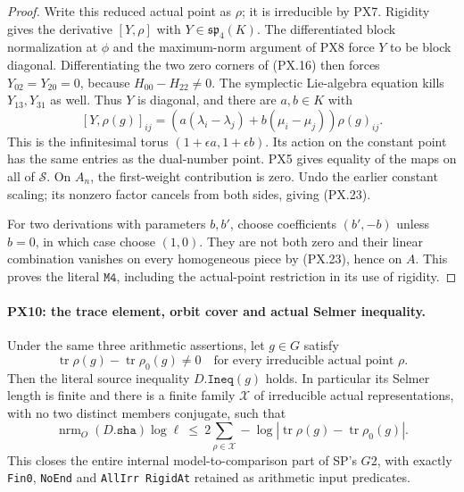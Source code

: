 \begin{proof}
Write this reduced actual point as
$\rho$; it is irreducible by PX7.
Rigidity gives the derivative
$[Y,\rho]$ with
$Y\in\mathfrak{sp}_4(K)$.
The differentiated block normalization
at $\phi$ and the maximum-norm
argument of PX8 force $Y$ to be
block diagonal.  Differentiating
the two zero corners of (PX.16)
then forces $Y_{02}=Y_{20}=0$,
because $H_{00}-H_{22}\ne0$.
The symplectic Lie-algebra equation
kills $Y_{13},Y_{31}$ as well.
Thus $Y$ is diagonal, and there
are $a,b\in K$ with
\[
 [Y,\rho(g)]_{ij}
   =(a(\lambda_i-\lambda_j)
                      +b(\mu_i-\mu_j))\rho(g)_{ij}.
 \tag{PX.24}
\]
This is the infinitesimal torus
$(1+\epsilon a,1+\epsilon b)$.
Its action on the constant point
has the same entries as the
dual-number point.  PX5 gives
equality of the maps on all of
$\mathcal S$.  On $A_n$, the
first-weight contribution is zero.
Undo the earlier constant scaling;
its nonzero factor cancels from
both sides, giving (PX.23).

For two derivations with parameters
$b,b'$, choose coefficients
$(b',-b)$ unless $b=0$, in which
case choose $(1,0)$.  They are
not both zero and their linear
combination vanishes on every
homogeneous piece by (PX.23),
hence on $A$.  This proves the
literal $\mathtt{M4}$, including
the actual-point restriction in
its use of rigidity.
\end{proof}

\paragraph{PX10: the trace element, orbit cover and actual Selmer inequality.}
\label{claim:PX10}
Under the same three arithmetic assertions, let
$g\in G$ satisfy
\[
 \operatorname{tr}\rho(g)-\operatorname{tr}\rho_0(g)\ne0
       \quad\text{for every irreducible actual point }\rho.
 \tag{PX.25}
\]
Then the literal source inequality $D.\mathtt{Ineq}(g)$
holds.  In particular its Selmer length is finite and
there is a finite family $\mathcal X$ of irreducible
actual representations, with no two distinct members
conjugate, such that
\[
 \operatorname{nrm}_O(D.\mathtt{sha})\log\ell
 \ \le\ 2\sum_{\rho\in\mathcal X}
 -\log\left|\operatorname{tr}\rho(g)
                         -\operatorname{tr}\rho_0(g)\right|.
 \tag{PX.26}
\]
This closes the entire internal model-to-comparison
part of SP's $G2$, with exactly \texttt{Fin0},
\texttt{NoEnd} and \texttt{AllIrr RigidAt} retained
as arithmetic input predicates.

